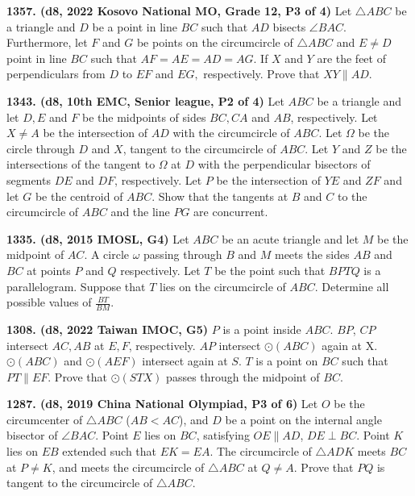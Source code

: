 \documentclass{article}
\begin{document}
\textbf{1357. (\color{red}d8\color{black}, 2022 Kosovo National MO, Grade 12, P3 of 4)} Let $\bigtriangleup ABC$ be a triangle and $D$ be a point in line $BC$ such that $AD$ bisects $\angle BAC$. Furthermore, let $F$ and $G$ be points on the circumcircle of $\bigtriangleup ABC$ and $E\neq D$ point in line $BC$ such that $AF=AE=AD=AG$. If $X$ and $Y$ are the feet of perpendiculars from $D$ to $EF$ and $EG,$ respectively. Prove that $XY\parallel AD$.


\textbf{1343. (\color{red}d8\color{black}, 10th EMC, Senior league, P2 of 4)} Let $ABC$ be a triangle and let $D, E$ and $F$ be the midpoints of sides $BC, CA$ and $AB$, respectively.
Let $X \ne A$ be the intersection of $AD$ with the circumcircle of $ABC$. Let $\Omega$ be the circle through $D$ and $X$,
tangent to the circumcircle of $ABC$. Let $Y$ and $Z$ be the intersections of the tangent to $\Omega$ at $D$ with the
perpendicular bisectors of segments $DE$ and $DF$, respectively. Let $P$ be the intersection of $YE$ and $ZF$ and
let $G$ be the centroid of $ABC$. Show that the tangents at $B$ and $C$ to the circumcircle of $ABC$ and the line $PG$ are concurrent.

\textbf{1335. (\color{red}d8\color{black}, 2015 IMOSL, G4)} Let $ABC$ be an acute triangle and let $M$ be the midpoint of $AC$. A circle $\omega$ passing through $B$ and $M$ meets the sides $AB$ and $BC$ at points $P$ and $Q$ respectively. Let $T$ be the point such that $BPTQ$ is a parallelogram. Suppose that $T$ lies on the circumcircle of $ABC$. Determine all possible values of $\frac{BT}{BM}$.

\textbf{1308. (\color{red}d8\color{black}, 2022 Taiwan IMOC, G5)} $P$ is a point inside $ABC$. $BP$, $CP$ intersect $AC, AB$ at $E, F$, respectively. $AP$ intersect $\odot (ABC)$ again at X. $\odot (ABC)$ and $\odot (AEF)$ intersect again at $S$. $T$ is a point on $BC$ such that $P T \parallel EF$. Prove that $\odot (ST X)$ passes through the midpoint of $BC$.

\textbf{1287. (\color{red}d8\color{black}, 2019 China National Olympiad, P3 of 6)} Let $O$ be the circumcenter of $\triangle ABC$ ($AB<AC$), and $D$ be a point on the internal angle bisector of $\angle BAC$. Point $E$ lies on $BC$, satisfying $OE\parallel AD$, $DE\perp BC$. Point $K$ lies on $EB$ extended such that $EK=EA$. The circumcircle of $\triangle ADK$ meets $BC$ at $P\neq K$, and meets the circumcircle of $\triangle ABC$ at $Q\neq A$. Prove that $PQ$ is tangent to the circumcircle of $\triangle ABC$.
\end{document}
